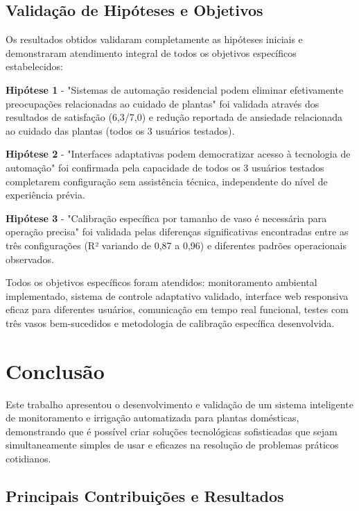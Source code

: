 \documentclass[oneside,english,brazilian]{UNISINOSmonografia}
\begin{document}
\section{Validação de Hipóteses e Objetivos}

Os resultados obtidos validaram completamente as hipóteses iniciais e demonstraram atendimento integral de todos os objetivos específicos estabelecidos:

\textbf{Hipótese 1} - "Sistemas de automação residencial podem eliminar efetivamente preocupações relacionadas ao cuidado de plantas" foi validada através dos resultados de satisfação (6,3/7,0) e redução reportada de ansiedade relacionada ao cuidado das plantas (todos os 3 usuários testados).

\textbf{Hipótese 2} - "Interfaces adaptativas podem democratizar acesso à tecnologia de automação" foi confirmada pela capacidade de todos os 3 usuários testados completarem configuração sem assistência técnica, independente do nível de experiência prévia.

\textbf{Hipótese 3} - "Calibração específica por tamanho de vaso é necessária para operação precisa" foi validada pelas diferenças significativas encontradas entre as três configurações (R² variando de 0,87 a 0,96) e diferentes padrões operacionais observados.

Todos os objetivos específicos foram atendidos: monitoramento ambiental implementado, sistema de controle adaptativo validado, interface web responsiva eficaz para diferentes usuários, comunicação em tempo real funcional, testes com três vasos bem-sucedidos e metodologia de calibração específica desenvolvida.

\chapter{Conclusão}

Este trabalho apresentou o desenvolvimento e validação de um sistema inteligente de monitoramento e irrigação automatizada para plantas domésticas, demonstrando que é possível criar soluções tecnológicas sofisticadas que sejam simultaneamente simples de usar e eficazes na resolução de problemas práticos cotidianos.

\section{Principais Contribuições e Resultados}
\end{document}
